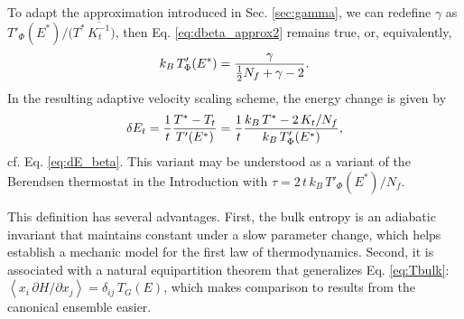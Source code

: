\documentclass[reprint]{revtex4-1}
\begin{document}
To adapt the approximation introduced in Sec. \ref{sec:gamma},
we can redefine $\gamma$ as
$T'_\Phi(E^*) / \bigl( T^* \, \overline{ K_t^{-1} } \bigr)$,
%
%
then Eq. \eqref{eq:dbeta_approx2} remains true,
or, equivalently,
%
\begin{equation}
  k_B \, T'_\Phi(E^*)
  =
  \frac{ \gamma }
  { \frac 1 2 N_f + \gamma - 2 }
  .
  \notag
\end{equation}
%
In the resulting adaptive velocity scaling
scheme, the energy change is given by
%
\begin{equation}
  \delta E_t
  =
  \frac 1 t
  \frac{ T^* - T_t } { T'(E^*) }
  =
  \frac 1 t
  \frac{ k_B \, T^* - 2 \, K_t / N_f }
       { k_B \, T'_\Phi(E^*) }
  ,
  \notag
\end{equation}
cf. Eq. \eqref{eq:dE_beta}.
%
This variant may be understood
as a variant of the Berendsen thermostat
in the Introduction
with
$\tau = 2 \, t \, k_B \, T'_\Phi(E^*) / N_f$.



This definition has several advantages.
%
First, the bulk entropy is an adiabatic invariant\cite{gibbs,
  hertz1910a, *hertz1910b, munster, becker, cagin1988, rugh2001, adib2002, dunkel2014}
  that maintains constant
  under a slow parameter change,
%
which helps establish a mechanic model
for the first law of thermodynamics.
%
Second, it is associated with a natural equipartition theorem\cite{
  khinchin, dunkel2014}
  that generalizes Eq. \eqref{eq:Tbulk}:
$\left\langle x_i \, \partial H/\partial x_j \right\rangle = \delta_{ij} \, T_G(E)$,
which makes comparison to results from the canonical ensemble easier.
\end{document}
